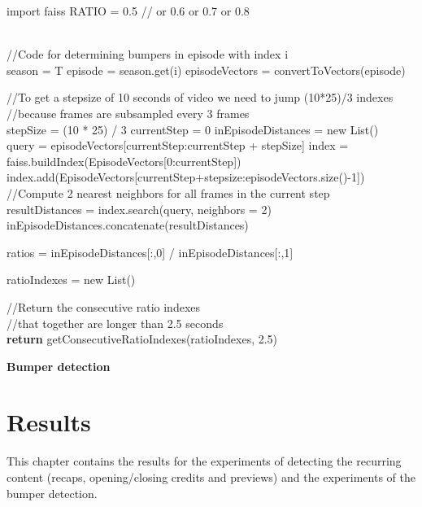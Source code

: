 \documentclass{report}
\begin{document}
\begin{algorithm}[H] 
	\SetAlgoLined
	
	import faiss\;
	RATIO = 0.5 // or 0.6 or 0.7 or 0.8 \\
	\texttt{\\}
	
	//Code for determining bumpers in episode with index i \\
	season = T\;
	episode = season.get(i)\;
	episodeVectors = convertToVectors(episode)\;
	\texttt{\\}
		
	//To get a stepsize of 10 seconds of video we need to jump (10*25)/3 indexes \\
	//because frames are subsampled every 3 frames \\
	stepSize = (10 * 25) / 3 \;
	currentStep = 0\;
	inEpisodeDistances = new List()\;
	{
	\texttt{\\}
	 query = episodeVectors[currentStep:currentStep + stepSize] \;
	 index = faiss.buildIndex(EpisodeVectors[0:currentStep])\;
	 index.add(EpisodeVectors[currentStep+stepsize:episodeVectors.size()-1])\;
	 \texttt{\\}
	 //Compute 2 nearest neighbors for all frames in the current step \\
	 resultDistances = index.search(query, neighbors = 2)\;
	 inEpisodeDistances.concatenate(resultDistances)\;
	}

	ratios = inEpisodeDistances[:,0] / inEpisodeDistances[:,1]\;
	
	ratioIndexes = new List()\;
	
	//Return the consecutive ratio indexes  \\
	//that together are longer than 2.5 seconds \\
	\textbf{return} getConsecutiveRatioIndexes(ratioIndexes, 2.5)\;
	
	\caption{\textbf{Bumper detection}}
	\label{algorithm:shotboundary}
\end{algorithm}

\chapter{Results} \label{results}
This chapter contains the results for the experiments of detecting the recurring content (recaps, opening/closing credits and previews) and the experiments of the bumper detection.
\end{document}
